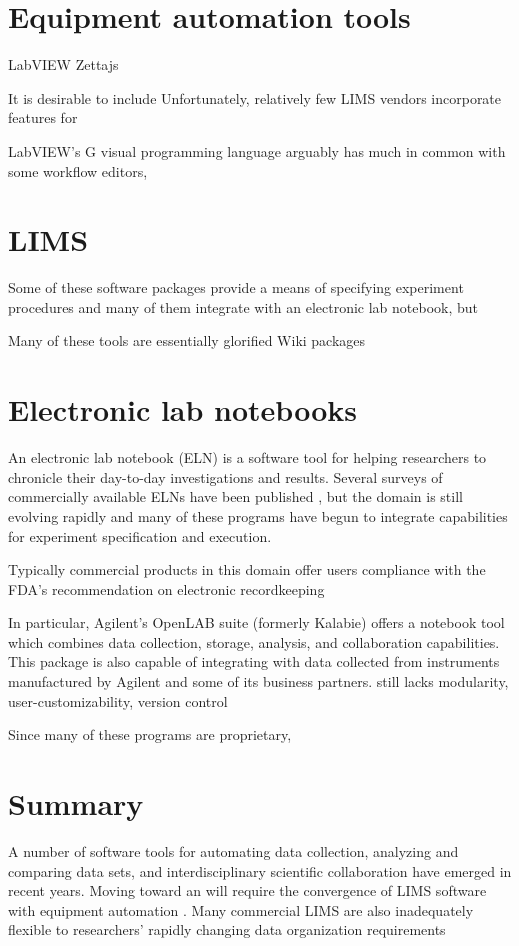 \section{Equipment automation tools}

LabVIEW
Zettajs

It is desirable to include
Unfortunately, relatively few LIMS vendors incorporate features for

LabVIEW's G visual programming language arguably has much in common
with some workflow editors,

\section{LIMS}
Some of these software packages provide a means of specifying
experiment procedures and many of them integrate with an electronic
lab notebook, but

Many of these tools are essentially glorified Wiki packages

\section{Electronic lab notebooks}

An electronic lab notebook (ELN) is a software tool for helping
researchers to chronicle their day-to-day investigations and
results. Several surveys of commercially available ELNs have been
published \cite{Rubacha2011, }, but the domain is still evolving
rapidly and many of these programs have begun to integrate
capabilities for experiment specification and execution.

Typically commercial products in this domain offer users compliance
with the FDA's recommendation on electronic recordkeeping \cite{FDA}

In particular, Agilent's OpenLAB suite (formerly Kalabie) offers a
notebook tool which combines data collection, storage, analysis, and
collaboration capabilities. This package is also capable of
integrating with data collected from instruments manufactured by
Agilent and some of its business partners.
 still lacks modularity,
user-customizability, version control

Since many of these programs are proprietary,



\section{Summary}

A number of software tools for automating data collection, analyzing
and comparing data sets, and interdisciplinary scientific
collaboration have emerged in recent years. Moving toward an    will
require the convergence of LIMS software with equipment automation .
Many commercial LIMS are also inadequately flexible to researchers'
rapidly changing data organization requirements